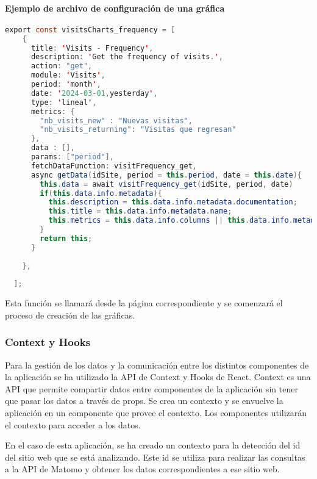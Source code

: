 \paragraph{Ejemplo de archivo de configuración de una gráfica}

\begin{lstlisting}[language=Java]
    export const visitsCharts_frequency = [
    {
      title: 'Visits - Frequency',
      description: 'Get the frequency of visits.',
      action: "get",
      module: 'Visits',
      period: 'month',
      date: '2024-03-01,yesterday',
      type: 'lineal',
      metrics: {
        "nb_visits_new" : "Nuevas visitas",
        "nb_visits_returning": "Visitas que regresan"
      },
      data : [],
      params: ["period"],
      fetchDataFunction: visitFrequency_get,
      async getData(idSite, period = this.period, date = this.date){
        this.data = await visitFrequency_get(idSite, period, date)
        if(this.data.info.metadata){
          this.description = this.data.info.metadata.documentation;
          this.title = this.data.info.metadata.name;
          this.metrics = this.data.info.columns || this.data.info.metadata.metrics || this.metrics;
        }  
        return this;
      }
      
    },
   
  ];
\end{lstlisting}

Esta función se llamará desde la página correspondiente y se comenzará el proceso de creación de las gráficas. 

\subsubsection{Context y Hooks}
\label{sec:context-hooks}

Para la gestión de los datos y la comunicación entre los distintos componentes de la aplicación se ha utilizado la API de Context
y Hooks de React. Context es una API que permite compartir datos entre componentes de la aplicación sin tener que pasar los datos
a través de props. Se crea un contexto y se envuelve la aplicación en un componente que provee el contexto. Los componentes utilizarán
el contexto para acceder a los datos. 

En el caso de esta aplicación, se ha creado un contexto para la detección del id del sitio web que se está analizando. Este id
se utiliza para realizar las consultas a la API de Matomo y obtener los datos correspondientes a ese sitio web. 

